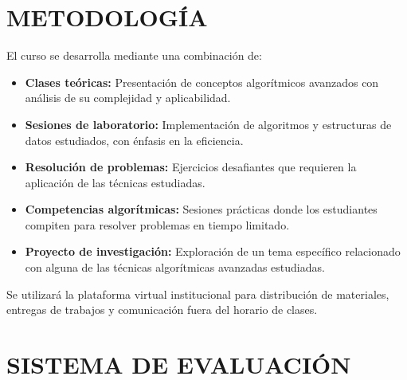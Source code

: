 \documentclass[12pt,a4paper]{article}
\begin{document}
\section{METODOLOGÍA}
\begin{tcolorbox}[colback=pucpGris!5,colframe=pucpGris,title=\textbf{Enfoque Metodológico}]
El curso se desarrolla mediante una combinación de:

\begin{itemize}[leftmargin=*]
    \item \textbf{Clases teóricas:} Presentación de conceptos algorítmicos avanzados con análisis de su complejidad y aplicabilidad.
    \item \textbf{Sesiones de laboratorio:} Implementación de algoritmos y estructuras de datos estudiados, con énfasis en la eficiencia.
    \item \textbf{Resolución de problemas:} Ejercicios desafiantes que requieren la aplicación de las técnicas estudiadas.
    \item \textbf{Competencias algorítmicas:} Sesiones prácticas donde los estudiantes compiten para resolver problemas en tiempo limitado.
    \item \textbf{Proyecto de investigación:} Exploración de un tema específico relacionado con alguna de las técnicas algorítmicas avanzadas estudiadas.
\end{itemize}

\begin{center}
\end{center}

Se utilizará la plataforma virtual institucional para distribución de materiales, entregas de trabajos y comunicación fuera del horario de clases.
\end{tcolorbox}
\vspace{0.5cm}

\section{SISTEMA DE EVALUACIÓN}
\end{document}

